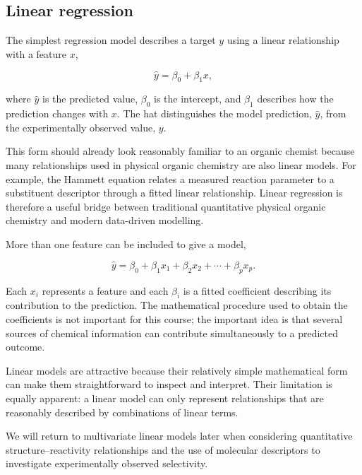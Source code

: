 \subsection{Linear regression}

The simplest regression model describes a target \(y\) using a linear relationship with a feature \(x\),

\begin{equation}
  \hat{y} = β_0 + β_1x,
\end{equation}

where \(\hat{y}\) is the predicted value, \(β_0\) is the intercept, and \(β_1\) describes how the prediction changes with \(x\).
The hat distinguishes the model prediction, \(\hat{y}\), from the experimentally observed value, \(y\).

This form should already look reasonably familiar to an organic chemist because many relationships used in physical organic chemistry are also linear models.
For example, the Hammett equation relates a measured reaction parameter to a substituent descriptor through a fitted linear relationship.
Linear regression is therefore a useful bridge between traditional quantitative physical organic chemistry and modern data-driven modelling.

More than one feature can be included to give a  model,

\begin{equation}
  \hat{y} = β_0 + β_1x_1 + β_2x_2 + \cdots + β_px_p.
\end{equation}

Each \(x_i\) represents a feature and each \(β_i\) is a fitted coefficient describing its contribution to the prediction.
The mathematical procedure used to obtain the coefficients is not important for this course; the important idea is that several sources of chemical information can contribute simultaneously to a predicted outcome.

Linear models are attractive because their relatively simple mathematical form can make them straightforward to inspect and interpret.
Their limitation is equally apparent: a linear model can only represent relationships that are reasonably described by combinations of linear terms.

We will return to multivariate linear models later when considering quantitative structure--reactivity relationships and the use of molecular descriptors to investigate experimentally observed selectivity.

